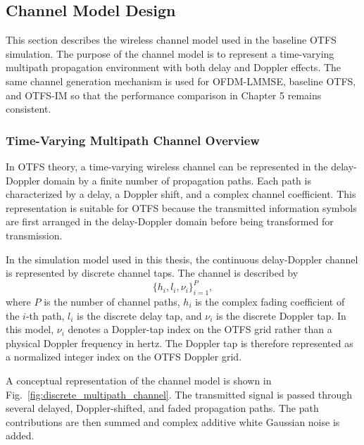 \subsection{Channel Model Design}

This section describes the wireless channel model used in the baseline OTFS simulation. The purpose of the channel model is to represent a time-varying multipath propagation environment with both delay and Doppler effects. The same channel generation mechanism is used for OFDM-LMMSE, baseline OTFS, and OTFS-IM so that the performance comparison in Chapter 5 remains consistent.

\subsubsection{Time-Varying Multipath Channel Overview}

In OTFS theory, a time-varying wireless channel can be represented in the delay-Doppler domain by a finite number of propagation paths. Each path is characterized by a delay, a Doppler shift, and a complex channel coefficient. This representation is suitable for OTFS because the transmitted information symbols are first arranged in the delay-Doppler domain before being transformed for transmission.

In the simulation model used in this thesis, the continuous delay-Doppler channel is represented by discrete channel taps. The channel is described by
\begin{equation}
    \{h_i,l_i,\nu_i\}_{i=1}^{P},
\end{equation}
where \(P\) is the number of channel paths, \(h_i\) is the complex fading coefficient of the \(i\)-th path, \(l_i\) is the discrete delay tap, and \(\nu_i\) is the discrete Doppler tap. In this model, \(\nu_i\) denotes a Doppler-tap index on the OTFS grid rather than a physical Doppler frequency in hertz. The Doppler tap is therefore represented as a normalized integer index on the OTFS Doppler grid.

A conceptual representation of the channel model is shown in Fig.~\ref{fig:discrete_multipath_channel}. The transmitted signal is passed through several delayed, Doppler-shifted, and faded propagation paths. The path contributions are then summed and complex additive white Gaussian noise is added.

